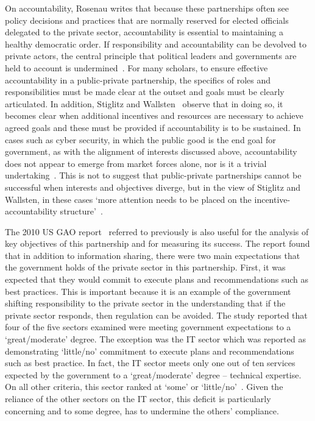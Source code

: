\documentclass[a4paper,11pt]{article}
\begin{document}
On accountability, Rosenau writes that because these partnerships
often see policy decisions and practices that are normally reserved
for elected officials delegated to the private sector, accountability
is essential to maintaining a healthy democratic order. If
responsibility and accountability can be devolved to private actors,
the central principle that political leaders and governments are held
to account is undermined~\cite{rosenau:1999}.  For many scholars, to
ensure effective accountability in a public-private partnership, the
specifics of roles and responsibilities must be made clear at the
outset and goals must be clearly articulated.  In addition, Stiglitz
and Wallsten~\cite{stiglitz+wallsten:1999} observe that in doing so,
it becomes clear when additional incentives and resources are
necessary to achieve agreed goals and these must be provided if
accountability is to be sustained.  In cases such as cyber security,
in which the public good is the end goal for government, as with the
alignment of interests discussed above, accountability does not appear
to emerge from market forces alone, nor is it a trivial
undertaking~\cite{williams:2014}.  This is not to suggest that
public-private partnerships cannot be successful when interests and
objectives diverge, but in the view of Stiglitz and Wallsten, in these
cases `more attention needs to be placed on the
incentive-accountability structure'~\cite{stiglitz+wallsten:1999}.

The 2010 US GAO report~\cite{usgao:2010} referred to previously is
also useful for the analysis of key objectives of this partnership and
for measuring its success.  The report found that in addition to
information sharing, there were two main expectations that the
government holds of the private sector in this partnership. First, it
was expected that they would commit to execute plans and
recommendations such as best practices. This is important because it
is an example of the government shifting responsibility to the private
sector in the understanding that if the private sector responds, then
regulation can be avoided. The study reported that four of the five
sectors examined were meeting government expectations to a
`great/moderate' degree. The exception was the IT sector which was
reported as demonstrating ‘little/no’ commitment to execute plans and
recommendations such as best practice.  In fact, the IT sector meets
only one out of ten services expected by the government to a
`great/moderate' degree – technical expertise. On all other criteria,
this sector ranked at `some' or `little/no'~\cite{usgao:2010}. Given
the reliance of the other sectors on the IT sector, this deficit is
particularly concerning and to some degree, has to undermine the
others' compliance.
\end{document}
